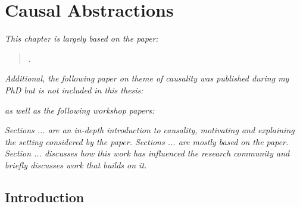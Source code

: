 \chapter{Causal Abstractions}

\ifpdf
    \graphicspath{{Chapter3/Figs/Raster/}{Chapter3/Figs/PDF/}{Chapter3/Figs/}}
\else
    \graphicspath{{Chapter3/Figs/Vector/}{Chapter3/Figs/}}
\fi

\emph{This chapter is largely based on the paper:}


\begin{quote}
.
\end{quote}


\emph{Additional, the following paper on theme of causality was published during my PhD but is not included in this thesis:}

\begin{quote}
\end{quote}

\emph{as well as the following workshop papers:}

\begin{quote}
\end{quote}

\begin{quote}
\end{quote}

\emph{Sections ... are an in-depth introduction to causality, motivating and explaining the setting considered by the paper.
Sections ... are mostly based on the paper. 
Section ... discusses how this work has influenced the research community and briefly discusses work that builds on it.}



\section{Introduction}

